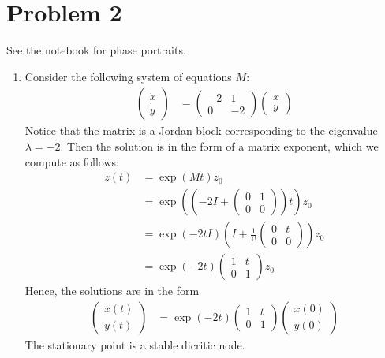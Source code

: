 \documentclass[12pt,letterpaper]{article}
\begin{document}
\section*{Problem 2}

See the notebook for phase portraits.

\begin{enumerate}[label=(\alph*)]
	\item Consider the following system of equations $M$:
	      \begin{align}
		      \begin{pmatrix}
			      \dot{x} \\
			      \dot{y}
		      \end{pmatrix} & = \begin{pmatrix}
			      -2 & 1  \\
			      0  & -2
		      \end{pmatrix}
		      \begin{pmatrix}
			      x \\
			      y
		      \end{pmatrix}
	      \end{align}
	      Notice that the matrix is a Jordan block corresponding to the eigenvalue $\lambda = -2$.
	      Then the solution is in the form of a matrix exponent, which we compute as follows:
	      \begin{align}
		      z(t) & = \exp(Mt)z_0                                                            \\
		           & = \exp\left(\left(-2 I + \begin{pmatrix}
					      0 & 1 \\
					      0 & 0
				      \end{pmatrix}\right)t\right)z_0    \\
		           & = \exp(-2t I) \left(I + \frac{1}{1!}\begin{pmatrix}
			      0 & t \\
			      0 & 0
		      \end{pmatrix}\right)z_0 \\
		           & = \exp(-2t)\begin{pmatrix}
			      1 & t \\
			      0 & 1
		      \end{pmatrix}z_0
	      \end{align}
	      Hence, the solutions are in the form
	      \begin{align}
		      \begin{pmatrix}
			      x(t) \\
			      y(t)
		      \end{pmatrix} & =\exp(-2t)\begin{pmatrix}
			      1 & t \\
			      0 & 1
		      \end{pmatrix}\begin{pmatrix}
			      x(0) \\
			      y(0)
		      \end{pmatrix}
	      \end{align}
	      The stationary point is a stable dicritic node.


\end{enumerate}
\end{document}
